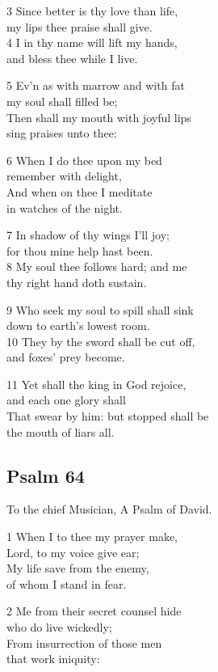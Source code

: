 3 Since better is thy love than life,\\
my lips thee praise shall give.\\
4 I in thy name will lift my hands,\\
and bless thee while I live.

5 Ev’n as with marrow and with fat\\
my soul shall filled be;\\
Then shall my mouth with joyful lips\\
sing praises unto thee:

6 When I do thee upon my bed\\
remember with delight,\\
And when on thee I meditate\\
in watches of the night.

7 In shadow of thy wings I’ll joy;\\
for thou mine help hast been.\\
8 My soul thee follows hard; and me\\
thy right hand doth sustain.

9 Who seek my soul to spill shall sink\\
down to earth’s lowest room.\\
10 They by the sword shall be cut off,\\
and foxes’ prey become.

11 Yet shall the king in God rejoice,\\
and each one glory shall\\
That swear by him: but stopped shall be\\
the mouth of liars all.

\begin{center}
\quad{}\quad{}
\end{center}

\subsection*{Psalm 64}

To the chief Musician,
A Psalm of David.

1 When I to thee my prayer make,\\
Lord, to my voice give ear;\\
My life save from the enemy,\\
of whom I stand in fear.

2 Me from their secret counsel hide\\
who do live wickedly;\\
From insurrection of those men\\
that work iniquity:

